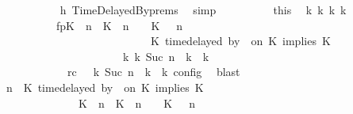 \begin{isabellebody}
\ \ \ \ \ \ \ \ \ \ \isamarkupfalse%
\ h{}\ TimeDelayedBy{\isachardot}prems\ \isamarkupfalse%
\ simp\isanewline
\ \ \ \ \ \ \ \ \isamarkupfalse%
\ this\ \isamarkupfalse%
\ {\isasymGamma}\isactrlsub k\ {\isasymPsi}\isactrlsub k\ {\isasymPhi}\isactrlsub k\ k\isanewline
\ \ \ \ \ \ \ \ \ \ \ fp{\isacharcolon}{\isacartoucheopen}{\isacharparenleft}{\isacharparenleft}{\isacharparenleft}K\ {\isasymUp}\ n{\isacharparenright}\ {\isacharhash}\ {\isacharparenleft}K\ {\isacharat}\ n\ {\isasymoplus}\ {\isasymdelta}{\isasymtau}\ {\isasymRightarrow}\ K\ {\isacharhash}\ {\isasymGamma}{\isacharparenright}{\isacharcomma}\ n\isanewline
\ \ \ \ \ \ \ \ \ \ \ \ \ \ \ \ \ \ \ \ \ \ \ \ \ {\isasymturnstile}\ {\isasymPsi}\ {\isasymtriangleright}\ {\isacharparenleft}{\isacharparenleft}K\ time{\isacharminus}delayed\ by\ {\isasymdelta}{\isasymtau}\ on\ K\ implies\ K\ {\isacharhash}\ {\isasymPhi}{\isacharparenright}{\isacharparenright}\isanewline
\ \ \ \ \ \ \ \ \ \ \ \ \ \ \ \ \ \ \ \ \ \ \ {\isasymhookrightarrow}\isactrlbsup k\isactrlesup \ {\isacharparenleft}{\isasymGamma}\isactrlsub k{\isacharcomma}\ Suc\ n\ {\isasymturnstile}\ {\isasymPsi}\isactrlsub k\ {\isasymtriangleright}\ {\isasymPhi}\isactrlsub k{\isacharparenright}{\isacartoucheclose}\isanewline
\ \ \ \ \ \ \ \ \ \ \ \ \ rc{\isacharcolon}{\isacartoucheopen}{\isasymrho}\ {\isasymin}\ {\isasymlbrakk}\ {\isasymGamma}\isactrlsub k{\isacharcomma}\ Suc\ n\ {\isasymturnstile}\ {\isasymPsi}\isactrlsub k\ {\isasymtriangleright}\ {\isasymPhi}\isactrlsub k\ {\isasymrbrakk}\isactrlsub c\isactrlsub o\isactrlsub n\isactrlsub f\isactrlsub i\isactrlsub g{\isacartoucheclose}\ \isamarkupfalse%
\ blast\isanewline
\ \ \ \ \ \ \ \ \isamarkupfalse%
\ {\isacartoucheopen}{\isacharparenleft}{\isasymGamma}{\isacharcomma}\ n\ {\isasymturnstile}\ {\isacharparenleft}{\isacharparenleft}K\ time{\isacharminus}delayed\ by\ {\isasymdelta}{\isasymtau}\ on\ K\ implies\ K\ {\isacharhash}\ {\isasymPsi}{\isacharparenright}\ {\isasymtriangleright}\ {\isasymPhi}{\isacharparenright}\isanewline
\ \ \ \ \ \ \ \ \ \ \ \ \ \ {\isasymhookrightarrow}\ {\isacharparenleft}{\isacharparenleft}{\isacharparenleft}K\ {\isasymUp}\ n{\isacharparenright}\ {\isacharhash}\ {\isacharparenleft}K\ {\isacharat}\ n\ {\isasymoplus}\ {\isasymdelta}{\isasymtau}\ {\isasymRightarrow}\ K\ {\isacharhash}\ {\isasymGamma}{\isacharparenright}{\isacharcomma}\ n\isanewline

\end{isabellebody}
